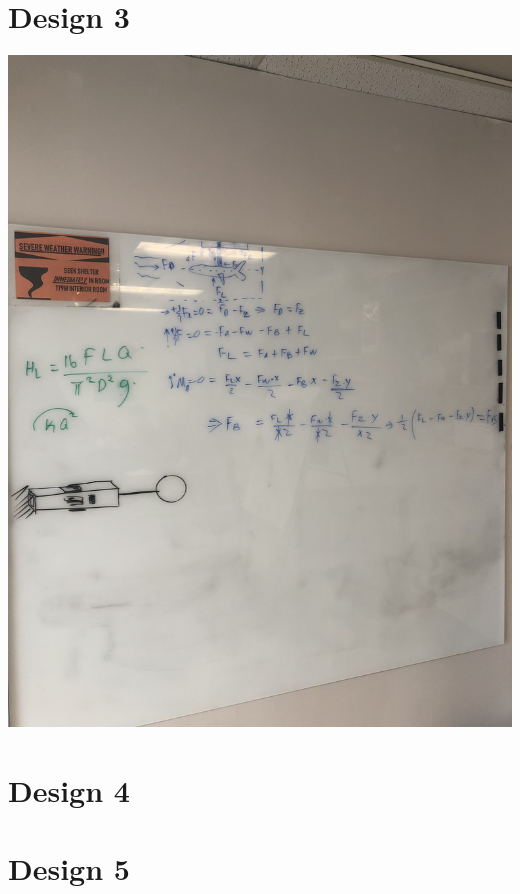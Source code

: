 \documentclass[12pt, letterpaper]{article}
\begin{document}
	\section{Design 3}
		\includegraphics[width = \textwidth]{IMG_6615.jpg}	
	\section{Design 4}
	
	\section{Design 5}
		
\end{document}
